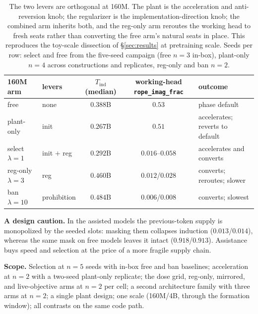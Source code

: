 \documentclass[11pt]{article}
\newcommand{\rif}{\texttt{rope\_imag\_frac}\xspace}
\begin{document}
\begin{table}[t]\centering\small\setlength{\tabcolsep}{5pt}
\begin{tabular}{l l c c l}\toprule
160M arm & levers & $T_{\mathrm{ind}}$ (median) & working-head \rif & outcome\\\midrule
free & none & $0.388$B & $0.53$ & phase default\\
plant-only & init & $0.267$B & $0.51$ & accelerates; reverts to default\\
select $\lambda{=}1$ & init $+$ reg & $0.292$B & $0.016$--$0.058$ & accelerates and converts\\
reg-only $\lambda{=}3$ & reg & $0.460$B & $0.012$/$0.028$ & converts; reroutes; slower\\
ban $\lambda{=}10$ & prohibition & $0.484$B & $0.006$/$0.008$ & converts; slowest\\
\bottomrule\end{tabular}
\caption{The two levers are orthogonal at 160M. The plant is the acceleration and anti-reversion knob; the
regularizer is the implementation-direction knob; the combined arm inherits both, and the reg-only arm reroutes
the working head to fresh seats rather than converting the free arm's natural seats in place. This reproduces the
toy-scale dissection of \S\ref{sec:results} at pretraining scale. Seeds per row: select and free from the
five-seed campaign (free $n{=}3$ in-box), plant-only $n{=}4$ across constructions and replicates, reg-only and
ban $n{=}2$.}
\label{tab:knobs}
\end{table}

\textbf{A design caution.} In the assisted models the previous-token supply is monopolized by the seeded slots:
masking them collapses induction ($0.013$/$0.014$), whereas the same mask on free models leaves it intact
($0.918$/$0.913$). Assistance buys speed and selection at the price of a more fragile supply chain.

\textbf{Scope.} Selection at $n{=}5$ seeds with in-box free and ban baselines; acceleration at $n{=}2$ with a
two-seed plant-only replicate; the dose grid, reg-only, mirrored, and live-objective arms at $n{=}2$ per cell; a
second architecture family with three arms at $n{=}2$; a single plant design; one scale (160M/4B, through the
formation window); all contrasts on the same code path.
\end{document}

